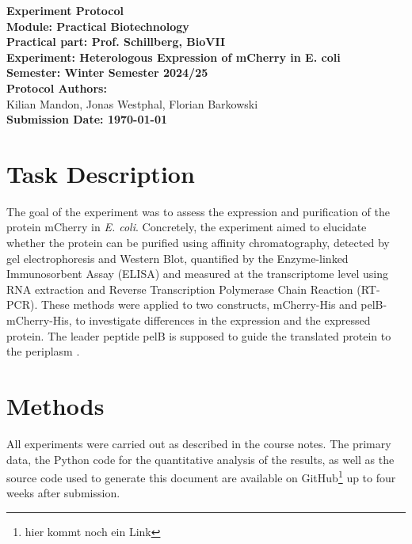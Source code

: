 \documentclass[a4paper,12pt]{article}
\begin{document}
\begin{titlepage}
    \begin{center}
        \textbf{\Huge Experiment Protocol}\\[2cm]
        
        \textbf{\LARGE Module: Practical Biotechnology}\\
        \textbf{\large Practical part: Prof. Schillberg, BioVII}\\[2cm]
        
        \textbf{\LARGE Experiment: Heterologous Expression of mCherry in E. coli}\\[2cm]
        
        \textbf{\large Semester: Winter Semester 2024/25}\\[2cm]
        
        \textbf{\large Protocol Authors: }\\
        Kilian Mandon, Jonas Westphal, Florian Barkowski\\
        [2cm]
        
        \textbf{\large Submission Date: \today}
    \end{center}
\end{titlepage}

\newpage
\tableofcontents
\newpage

\section{Task Description}
The goal of the experiment was to assess the expression and purification of the protein mCherry in \emph{E. coli}. Concretely, the experiment aimed to elucidate whether the protein can be purified using affinity chromatography, detected by gel electrophoresis and Western Blot, quantified by the Enzyme-linked Immunosorbent Assay (ELISA) and measured at the transcriptome level using RNA extraction and Reverse Transcription Polymerase Chain Reaction (RT-PCR). These methods were applied to two constructs, mCherry-His and pelB-mCherry-His, to investigate differences in the expression and the expressed protein. The leader peptide pelB is supposed to guide the translated protein to the periplasm \cite{Sockolosky2013}. 

\section{Methods}
All experiments were carried out as described in the course notes. The primary data, the Python code for the quantitative analysis of the results, as well as the source code used to generate this document are available on GitHub\footnote{hier kommt noch ein Link} up to four weeks after submission.
\end{document}
